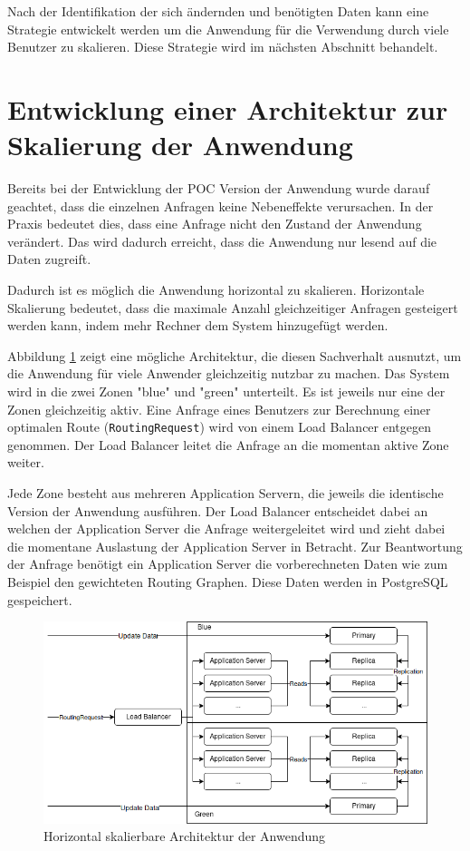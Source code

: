 \documentclass[
ngerman          %
,a4paper          %
,11pt
,pdftex
]{report}
\begin{document}
Nach der Identifikation der sich ändernden und benötigten Daten kann eine Strategie entwickelt werden um die Anwendung für die Verwendung durch viele Benutzer zu skalieren. Diese Strategie wird im nächsten Abschnitt behandelt.
\section{Entwicklung einer Architektur zur Skalierung der Anwendung}
\label{sec:orgcd082c3}
Bereits bei der Entwicklung der \ac{POC} Version der Anwendung wurde darauf geachtet, dass die einzelnen Anfragen keine Nebeneffekte verursachen. In der Praxis bedeutet dies, dass eine Anfrage nicht den Zustand der Anwendung verändert. Das wird dadurch erreicht, dass die Anwendung nur lesend auf die Daten zugreift.

Dadurch ist es möglich die Anwendung horizontal zu skalieren. Horizontale Skalierung bedeutet, dass die maximale Anzahl gleichzeitiger Anfragen gesteigert werden kann, indem mehr Rechner dem System hinzugefügt werden.

Abbildung \ref{fig:scaling} zeigt eine mögliche Architektur, die diesen Sachverhalt ausnutzt, um die Anwendung für viele Anwender gleichzeitig nutzbar zu machen. Das System wird in die zwei Zonen "blue" und "green" unterteilt. Es ist jeweils nur eine der Zonen gleichzeitig aktiv. Eine Anfrage eines Benutzers zur Berechnung einer optimalen Route (\texttt{RoutingRequest}) wird von einem Load Balancer entgegen genommen. Der Load Balancer leitet die Anfrage an die momentan aktive Zone weiter.

Jede Zone besteht aus mehreren Application Servern, die jeweils die identische Version der Anwendung ausführen. Der Load Balancer entscheidet dabei an welchen der Application Server die Anfrage weitergeleitet wird und zieht dabei die momentane Auslastung der Application Server in Betracht. Zur Beantwortung der Anfrage benötigt ein Application Server die vorberechneten Daten wie zum Beispiel den gewichteten Routing Graphen. Diese Daten werden in PostgreSQL gespeichert.

\begin{figure}[htbp]
\centering
\includegraphics[width=.9\linewidth]{arch.png}
\caption{\label{fig:scaling}
Horizontal skalierbare Architektur der Anwendung}
\end{figure}
\end{document}
